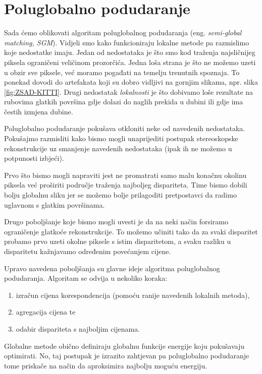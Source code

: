 \documentclass[utf8, zavrsni, numeric]{fer}
\begin{document}
\chapter{Poluglobalno podudaranje}

Sada ćemo oblikovati algoritam poluglobalnog podudaranja (eng. {\sl semi-global matching, SGM}).
Vidjeli smo kako funkcioniraju lokalne metode pa razmislimo koje nedostatke imaju. Jedan od nedostataka je što
smo kod traženja najsličnijeg piksela ograničeni veličinom prozorčića. Jedna loša strana je što ne možemo uzeti u obzir sve piksele, već moramo pogađati na temelju trenutnih spoznaja.
To ponekad dovodi do artefakata koji su dobro vidljivi na gornjim slikama, npr. slika \ref{fig:ZSAD-KITTI}.
Drugi nedostatak {\sl lokalnosti} je što dobivamo loše rezultate na rubovima glatkih površina
gdje dolazi do naglih prekida u dubini ili gdje ima čestih izmjena dubine.

Poluglobalno podudaranje pokušava otkloniti neke od navedenih nedostataka. Pokušajmo razmisliti kako bismo mogli unaprijediti postupak stereoskopske rekonstrukcije uz smanjenje navedenih nedostataka (ipak ih ne možemo u potpunosti izbjeći).

Prvo što bismo mogli napraviti jest ne promatrati samo malu konačnu okolinu piksela već proširiti područje traženja najboljeg dispariteta. Time bismo dobili bolju globalnu sliku jer se možemo bolje prilagoditi pretpostavci da radimo uglavnom s glatkim površinama.

Drugo poboljšanje koje bismo mogli uvesti je da na neki način forsiramo ograničenje glatkoće rekonstrukcije.
To možemo učiniti tako da za svaki disparitet probamo prvo uzeti okolne piksele s istim disparitetom, a svaku razliku u disparitetu kažnjavamo određenim povećanjem cijene.

Upravo navedena poboljšanja su glavne ideje algoritma poluglobalnog podudaranja. Algoritam se odvija u nekoliko koraka:
\begin{enumerate}
  \item izračun cijena korespondencija (pomoću ranije navedenih lokalnih metoda),
  \item agregacija cijena te
  \item odabir dispariteta s najboljim cijenama.
\end{enumerate}

Globalne metode obično definiraju globalnu funkcije energije koju pokušavaju optimirati.
No, taj postupak je izrazito zahtjevan pa poluglobalno podudaranje tome priskače na način
da aproksimira najbolju moguću energiju.
\end{document}
